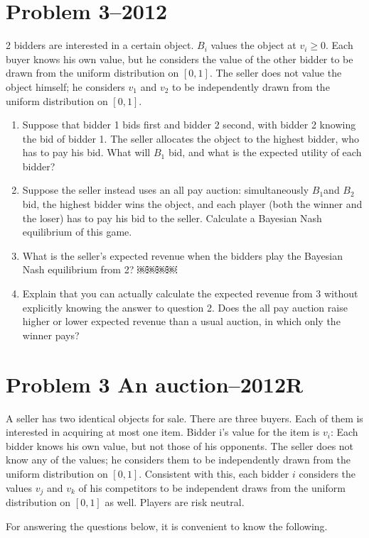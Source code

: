 \documentclass[a4paper]{article}
\begin{document}
\section*{Problem 3--2012}
2 bidders are interested in a certain object. $B_{i}$ values the object at $v_{i}\ge 0$. Each buyer knows his own value, but he considers the value of the other bidder to be drawn from the uniform distribution on $[0,1]$. The seller does not value the object himself; he considers $v_1$ and $v_2$ to be independently drawn from the uniform distribution on $[0,1]$.
\begin{enumerate}
	\item Suppose that bidder 1 bids first and bidder 2 second, with bidder 2 knowing the bid of bidder 1. The seller allocates the object to the highest bidder, who has to pay his bid. What will $B_1$ bid, and what is the expected utility of each bidder?
	\item Suppose the seller instead uses an all pay auction: simultaneously $B_1$and $B_2$ bid, the highest bidder wins the object, and each player (both the winner and the loser) has to pay his bid to the seller. Calculate a Bayesian Nash equilibrium of this game.
	\item What is the seller's expected revenue when the bidders play the Bayesian Nash equilibrium from 2?
￼￼￼￼	\item Explain that you can actually calculate the expected revenue from 3 without explicitly knowing the answer to question 2. Does the all pay auction raise higher or lower expected revenue than a usual auction, in which only the winner pays?
\end{enumerate}

\section*{Problem 3 An auction--2012R}
A seller has two identical objects for sale. There are three buyers. Each of them is interested in acquiring at most one item. Bidder i's value for the item is $v_i$: Each bidder knows his own value, but not those of his opponents. The seller does not know any of the values; he considers them to be independently drawn from the uniform distribution on $[0,1]$. Consistent with this, each bidder $i$ considers the values $v_j$ and $v_k$ of his competitors to be independent draws from the uniform distribution on $[0,1]$ as well. Players are risk neutral.

For answering the questions below, it is convenient to know the following.
\end{document}
